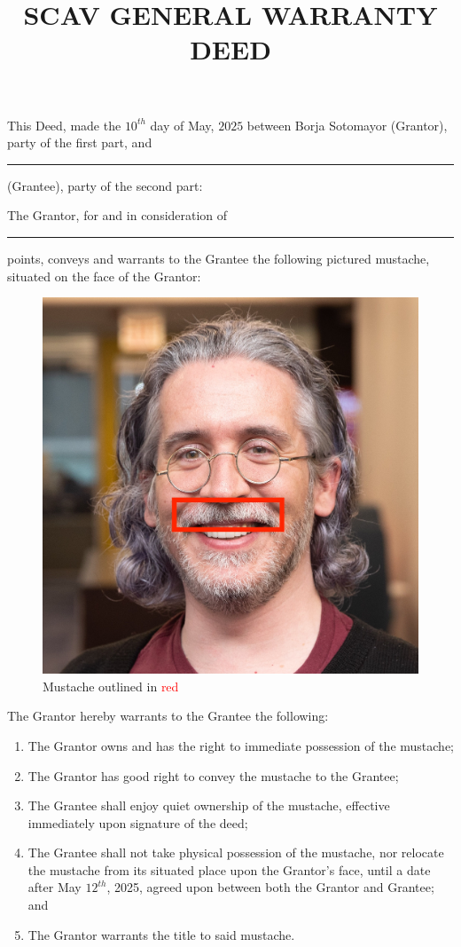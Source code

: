 \documentclass[12pt]{article}
\title{\textbf{\large SCAV GENERAL WARRANTY DEED}}
\date{}
\begin{document}
\maketitle

This Deed, made the $10^{th}$ day of May, $2025$ between Borja Sotomayor
(Grantor), party of the first part, and \rule{3cm}{0.15mm} (Grantee), party of the second
part:

\vspace{3em}

The Grantor, for and in consideration of \rule{2cm}{0.15mm} points, conveys and
warrants to the Grantee the following pictured mustache, situated on the face of
the Grantor:

\vspace{3em}
\begin{figure}[!htb]
    \begin{minipage}{0.48\textwidth}
      \centering
      \includegraphics[width=.7\linewidth]{borja-mustache.jpeg}
      \caption{Mustache outlined in \textcolor{red}{red}}
    \end{minipage}
\end{figure}


\begin{centering}
    The Grantor hereby warrants to the Grantee the following:
    \begin{enumerate}
        \item {The Grantor owns and has the right to
        immediate possession of the mustache;}
        \item {The Grantor has good right to convey the mustache to the Grantee;}
        \item {The Grantee shall enjoy quiet ownership of the mustache,
        effective immediately upon signature of the deed;}
        \item {The Grantee shall not take physical possession of the mustache,
        nor relocate the mustache from its situated place upon the Grantor's
        face, until a date after May $12^{th}$, 2025, agreed upon between both
        the Grantor and Grantee; and}
        \item {The Grantor warrants the title to said mustache.}
    \end{enumerate}
\end{centering}
\end{document}
